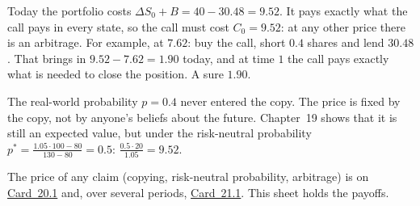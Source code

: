 Today the portfolio costs $\Delta S_0+B=40-30.48=9.52$. It pays exactly what the call pays in every state, so the call must cost $C_0=9.52$: at any other price there is an arbitrage. For example, at $7.62$: buy the call, short $0.4$ shares and lend $30.48$. That brings in $9.52-7.62=1.90$ today, and at time $1$ the call pays exactly what is needed to close the position. A sure $1.90$.

\begin{intuition}
The real-world probability $p=0.4$ never entered the copy. The price is fixed by the copy, not by anyone's beliefs about the future. Chapter~19 shows that it is still an expected value, but under the risk-neutral probability $p^*=\frac{1.05\cdot100-80}{130-80}=0.5$: $\frac{0.5\cdot20}{1.05}=9.52$.
\end{intuition}


The price of any claim (copying, risk-neutral probability, arbitrage) is on \hyperref[card:finite]{Card~20.1} and, over several periods, \hyperref[card:tree]{Card~21.1}. This sheet holds the payoffs.

